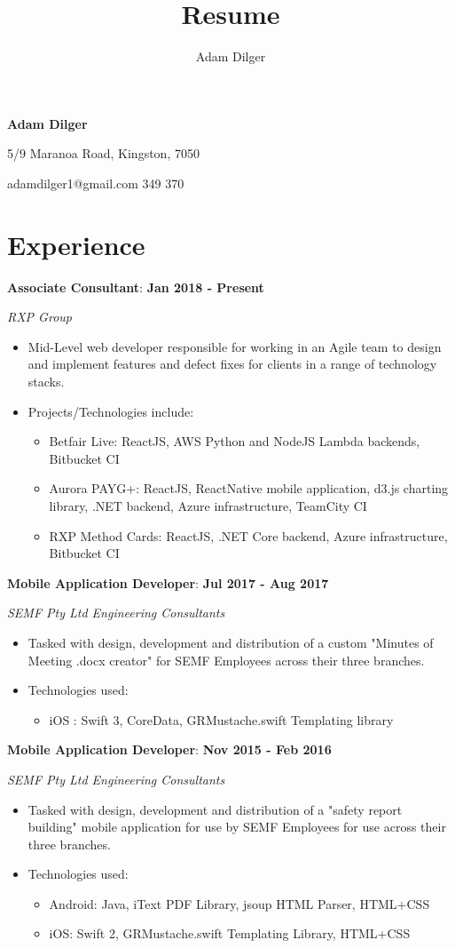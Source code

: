 \documentclass{article}
\author{Adam Dilger}
\title{Resume}
\makeatletter
\newcommand{\worktitle}[4]{
  \setlength{\parindent}{0pt}
  \small
  \textbf{#3}:
  \hfill
  \textbf{#1 - #2}

  \textit{#4}
}
\renewcommand{\maketitle}{
  \begin{center}
  \huge\textbf{Adam Dilger}
  \vspace{1mm}


  \normalsize
  5/9 Maranoa Road, Kingston, 7050

  adamdilger1@gmail.com
  \textbar
  \space
  0487 349 370
  \end{center}
}
\makeatother
\begin{document}
\maketitle

\section{Experience}

\worktitle
{Jan 2018}{Present}
{Associate Consultant}
{RXP Group}
\begin{itemize}
  \item Mid-Level web developer responsible for working in an Agile team to design and implement features and defect fixes for clients in a range of technology stacks.
  \item Projects/Technologies include:
  \begin{itemize}
    \item Betfair Live: ReactJS, AWS Python and NodeJS Lambda backends, Bitbucket CI
    \item Aurora PAYG+: ReactJS, ReactNative mobile application, d3.js charting library, .NET backend, Azure infrastructure, TeamCity CI
    \item RXP Method Cards: ReactJS, .NET Core backend, Azure infrastructure, Bitbucket CI
  \end{itemize}
\end{itemize}

\vspace{4mm}

\worktitle
{Jul 2017}{Aug 2017}
{Mobile Application Developer}
{SEMF Pty Ltd Engineering Consultants}
\begin{itemize}
  \item Tasked with design, development and distribution of a custom "Minutes of Meeting .docx creator" for SEMF Employees across their three branches.
  \item Technologies used:
  \begin{itemize}
    \item iOS : Swift 3, CoreData, GRMustache.swift Templating library
  \end{itemize}
\end{itemize}

\vspace{4mm}

\worktitle
{Nov 2015}{Feb 2016}
{Mobile Application Developer}
{SEMF Pty Ltd Engineering Consultants}
\begin{itemize}
  \item Tasked with design, development and distribution of a "safety report building" mobile application for use by SEMF Employees for use across their three branches.

  \item Technologies used:
  \begin{itemize}
    \item Android: Java, iText PDF Library, jsoup HTML Parser, HTML+CSS
    \item iOS: Swift 2, GRMustache.swift Templating Library, HTML+CSS
  \end{itemize}
\end{itemize}
\end{document}
